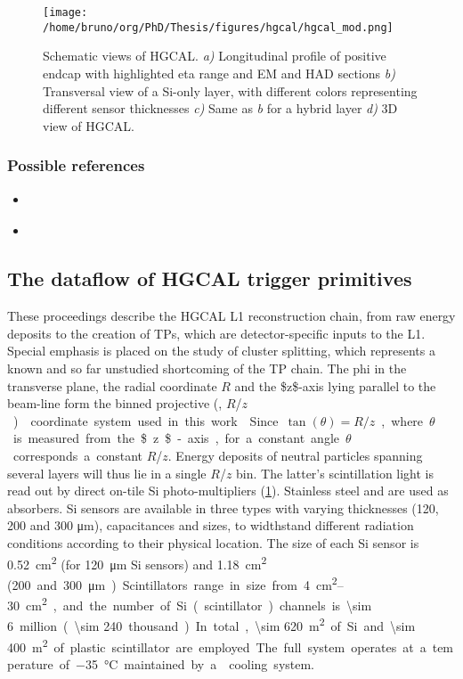 \documentclass[11pt]{article}
\newcommand{\coordsa}{(\si{\azi}, \si{\rz})}
\newcommand{\rz}{$R$/$z$}
\begin{document}
\begin{figure}[htbp]
\centering
\texttt{[image: /home/bruno/org/PhD/Thesis/figures/hgcal/hgcal\_mod.png]}
\caption{\label{fig:hgcal}Schematic views of \ac{HGCAL}. \textit{a)} Longitudinal profile of positive endcap with highlighted \ac{eta} range and \ac{EM} and \ac{HAD} sections \emph{b)} Transversal view of a \ac{Si}-only layer, with different colors representing different sensor thicknesses \emph{c)} Same as \textit{b} for a hybrid layer \emph{d)} 3D view of \ac{HGCAL}.}
\end{figure}


\subsubsection{Possible references}
\label{sec:org0b8aabe}
\begin{itemize}
\item \cite{cms_offline_computing}
\item \cite{hgcalTDR}
\end{itemize}
\subsection{The dataflow of HGCAL trigger primitives}
\label{sec:org26bf1d9}
These proceedings describe the \ac{HGCAL} \ac{L1} reconstruction chain, from raw energy deposits to the creation of \acp{TP}, which are detector-specific inputs to the \ac{L1}.
Special emphasis is placed on the study of cluster splitting, which represents a known and so far unstudied shortcoming of the \ac{TP} chain.
The \ac{phi} in the transverse plane, the radial coordinate \(R\) and the \$z\$-axis lying parallel to the beam-line form the binned projective \coordsa{} coordinate system used in this work \cite{cms_collab}.
Since \(\tan(\theta) = R/z\), where \(\theta\) is measured from the \$z\$-axis, for a constant angle \(\theta\) corresponds a constant \rz{}.
Energy deposits of neutral particles spanning several layers will thus lie in a single \rz{} bin.
The latter's scintillation light is read out by direct on-tile \ac{Si} photo-multipliers (\cref{fig:hgcal}). Stainless steel and  are used as absorbers.
\ac{Si} sensors are available in three types with varying thicknesses (120, 200 and 300 \si{\micro\meter}), capacitances and sizes, to widthstand different radiation conditions according to their physical location.
The size of each \ac{Si} sensor is \SI{0.52}{\cm\squared} (for \SI{120}{\micro\meter} \ac{Si} sensors) and \SI{1.18}{\cm\squared} (\qty{200} and \SI{300}{\micro\meter}).
Scintillators range in size from \qtyrange{4}{30}{\cm\squared}, and the number of \ac{Si} (scintillator) channels is \num{\sim 6} million (\num{\sim 240} thousand).
In total, \SI{\sim 620}{\meter\squared} of \ac{Si} and \SI{\sim 400}{\meter\squared} of plastic scintillator are employed.
The full system operates at a temperature of \SI{-35}{\celsius} maintained by a  cooling system.
\end{document}
